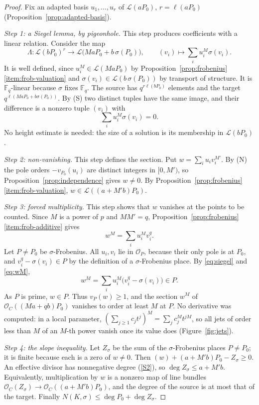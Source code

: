 \documentclass[11pt]{amsbook}
\theoremstyle{plain}
\theoremstyle{definition}
\theoremstyle{remark}
\numberwithin{equation}{section}
\numberwithin{figure}{chapter}
\numberwithin{table}{chapter}
\newcommand{\F}{\mathbb{F}}
\newcommand{\calL}{\mathcal{L}}
\newcommand{\calO}{\mathcal{O}}
\begin{document}
\begin{proof}
Fix an adapted basis $u_1,\dots,u_r$ of $\calL(aP_0)$,
$r=\ell(aP_0)$ (Proposition~\ref{prop:adapted-basis}).

\emph{Step 1: a Siegel lemma, by pigeonhole.} This step produces
coefficients with a linear relation. Consider the map
\[
\Lambda\colon\calL(bP_0)^r
\to\calL\bigl(MaP_0+b\,\sigma(P_0)\bigr),\qquad
(v_i)\mapsto\sum_iu_i^M\sigma(v_i).
\]
It is well defined, since $u_i^M\in\calL(MaP_0)$ by
Proposition~\ref{prop:frobenius}\eqref{item:frob-valuation} and
$\sigma(v_i)\in\calL(b\,\sigma(P_0))$ by transport of structure. It
is $\F_q$-linear because $\sigma$ fixes $\F_q$. The source has
$q^{r\ell(bP_0)}$ elements and the target
$q^{\ell(MaP_0+b\sigma(P_0))}$. By (S) two distinct tuples have the
same image, and their difference is a nonzero tuple $(v_i)$ with
\begin{equation}\label{eq:siegel}
\sum_iu_i^M\sigma(v_i)=0.
\end{equation}
No height estimate is needed: the size of a solution is its
membership in $\calL(bP_0)$.

\emph{Step 2: non-vanishing.} This step defines the section. Put
$w=\sum_iu_iv_i^{M'}$. By (N) the pole orders $-v_{P_0}(u_i)$ are
distinct integers in $[0,M')$, so
Proposition~\ref{prop:independence} gives $w\ne0$. By
Proposition~\ref{prop:frobenius}\eqref{item:frob-valuation},
$w\in\calL((a+M'b)P_0)$.

\emph{Step 3: forced multiplicity.} This step shows that $w$
vanishes at the points to be counted. Since $M$ is a power of $p$
and $MM'=q$,
Proposition~\ref{prop:frobenius}\eqref{item:frob-additive} gives
\begin{equation}\label{eq:wM}
w^M=\sum_iu_i^Mv_i^q.
\end{equation}
Let $P\ne P_0$ be $\sigma$-Frobenius. All $u_i,v_i$ lie in
$\calO_P$, because their only pole is at $P_0$, and
$v_i^q-\sigma(v_i)\in P$ by the definition of a
$\sigma$-Frobenius place. By \eqref{eq:siegel} and \eqref{eq:wM},
\[
w^M=\sum_iu_i^M\bigl(v_i^q-\sigma(v_i)\bigr)\in P.
\]
As $P$ is prime, $w\in P$. Thus $v_P(w)\ge1$, and the section $w^M$
of $\calO_C((Ma+qb)P_0)$ vanishes to order at least $M$ at $P$. No
derivative was computed: in a local parameter,
$(\sum_{j\ge1}c_jt^j)^M=\sum_jc_j^Mt^{jM}$, so all jets of order
less than $M$ of an $M$-th power vanish once its value does
(Figure~\ref{fig:jets}).

\emph{Step 4: the slope inequality.} Let
$Z_\sigma$ be the sum of the $\sigma$-Frobenius places $P\ne P_0$;
it is finite because each is a zero of $w\ne0$. Then
$(w)+(a+M'b)P_0-Z_\sigma\ge0$. An effective divisor has nonnegative
degree (\ref{S2}), so $\deg Z_\sigma\le a+M'b$. Equivalently,
multiplication by $w$ is a nonzero map of line bundles
$\calO_C(Z_\sigma)\to\calO_C((a+M'b)P_0)$, and the degree of the
source is at most that of the target. Finally
$N(K,\sigma)\le\deg P_0+\deg Z_\sigma$.
\end{proof}
\end{document}
